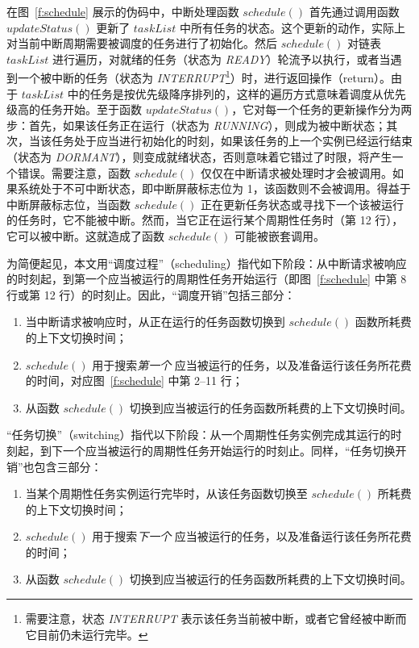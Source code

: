 在图~\ref{f:schedule} 展示的伪码中，中断处理函数 $\mathit{schedule()}$ 首先通过调用函数 $\mathit{updateStatus()}$ 更新了 $\mathit{taskList}$ 中所有任务的状态。这个更新的动作，实际上对当前中断周期需要被调度的任务进行了初始化。然后 $\mathit{schedule()}$ 对链表 $\mathit{taskList}$ 进行遍历，对就绪的任务（状态为 \textit{READY}）轮流予以执行，或者当遇到一个被中断的任务（状态为 \textit{INTERRUPT}\footnote{需要注意，状态 \textit{INTERRUPT} 表示该任务当前被中断，或者它曾经被中断而它目前仍未运行完毕。}）时，进行返回操作（return）。由于 $\mathit{taskList}$ 中的任务是按优先级降序排列的，这样的遍历方式意味着调度从优先级高的任务开始。至于函数 $\mathit{updateStatus()}$，它对每一个任务的更新操作分为两步：首先，如果该任务正在运行（状态为 \textit{RUNNING}），则成为被中断状态；其次，当该任务处于应当进行初始化的时刻，如果该任务的上一个实例已经运行结束（状态为 \textit{DORMANT}），则变成就绪状态，否则意味着它错过了时限，将产生一个错误。需要注意，函数 $\mathit{schedule()}$ 仅仅在中断请求被处理时才会被调用。如果系统处于不可中断状态，即中断屏蔽标志位为 1，该函数则不会被调用。得益于中断屏蔽标志位，当函数 $\mathit{schedule()}$ 正在更新任务状态或寻找下一个该被运行的任务时，它不能被中断。然而，当它正在运行某个周期性任务时（第 12 行），它可以被中断。这就造成了函数 $\mathit{schedule()}$ 可能被嵌套调用。

为简便起见，本文用“调度过程”（scheduling）指代如下阶段：从中断请求被响应的时刻起，到第一个应当被运行的周期性任务开始运行（即图~\ref{f:schedule} 中第 8 行或第 12 行）的时刻止。因此，“调度开销”包括三部分：
\begin{enumerate}
\item 当中断请求被响应时，从正在运行的任务函数切换到 $\mathit{schedule()}$ 函数所耗费的上下文切换时间；
\item $\mathit{schedule()}$ 用于搜索\emph{第一个} 应当被运行的任务，以及准备运行该任务所花费的时间，对应图~\ref{f:schedule} 中第 2--11 行；
\item 从函数 $\mathit{schedule()}$ 切换到应当被运行的任务函数所耗费的上下文切换时间。
\end{enumerate}
“任务切换”（switching）指代以下阶段：从一个周期性任务实例完成其运行的时刻起，到下一个应当被运行的周期性任务开始运行的时刻止。同样，“任务切换开销”也包含三部分：
\begin{enumerate}
\item 当某个周期性任务实例运行完毕时，从该任务函数切换至 $\mathit{schedule()}$ 所耗费的上下文切换时间；
\item $\mathit{schedule()}$ 用于搜索\emph{下一个} 应当被运行的任务，以及准备运行该任务所花费的时间；
\item 从函数 $\mathit{schedule()}$ 切换到应当被运行的任务函数所耗费的上下文切换时间。
\end{enumerate}
 

